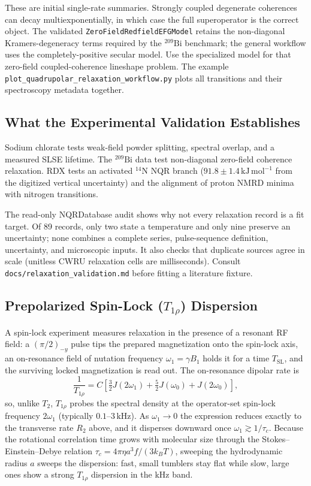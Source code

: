 \documentclass[11pt,oneside]{report}
\newcommand{\code}[1]{\texttt{#1}}
\begin{document}
These are initial single-rate summaries. Strongly coupled degenerate coherences
can decay multiexponentially, in which case the full superoperator is the
correct object. The validated \code{ZeroFieldRedfieldEFGModel} retains the
non-diagonal Kramers-degeneracy terms required by the
\(^{209}\mathrm{Bi}\) benchmark; the general workflow uses the
completely-positive secular model. Use the specialized model for that
zero-field coupled-coherence lineshape problem. The example
\code{plot\_quadrupolar\_relaxation\_workflow.py} plots all transitions and
their spectroscopy metadata together.

\subsection{What the Experimental Validation Establishes}

Sodium chlorate tests weak-field powder splitting, spectral overlap, and a
measured SLSE lifetime. The \(^{209}\mathrm{Bi}\) data test non-diagonal
zero-field coherence relaxation. RDX tests an activated \(^{14}\mathrm{N}\) NQR
branch (\(91.8\pm1.4\,\mathrm{kJ\,mol^{-1}}\) from the digitized vertical
uncertainty) and the alignment of proton NMRD minima with nitrogen transitions.

The read-only NQRDatabase audit shows why not every relaxation record is a fit
target. Of 89 records, only two state a temperature and only nine preserve an
uncertainty; none combines a complete series, pulse-sequence definition,
uncertainty, and microscopic inputs. It also checks that duplicate sources
agree in scale (unitless CWRU relaxation cells are milliseconds). Consult
\code{docs/relaxation\_validation.md} before fitting a literature fixture.

\subsection{Prepolarized Spin-Lock (\texorpdfstring{$T_{1\rho}$}{T1rho}) Dispersion}

A spin-lock experiment measures relaxation in the presence of a resonant RF
field: a \((\pi/2)_{-y}\) pulse tips the prepared magnetization onto the
spin-lock axis, an on-resonance field of nutation frequency
\(\omega_1=\gamma B_1\) holds it for a time \(T_{\mathrm{SL}}\), and the surviving
locked magnetization is read out. The on-resonance dipolar rate is
\[
  \frac{1}{T_{1\rho}}
    = C\left[\tfrac{3}{2}J(2\omega_1)
      + \tfrac{5}{2}J(\omega_0) + J(2\omega_0)\right],
\]
so, unlike \(T_2\), \(T_{1\rho}\) probes the spectral density at the operator-set
spin-lock frequency \(2\omega_1\) (typically \(0.1\text{--}3\,\mathrm{kHz}\)). As
\(\omega_1\to 0\) the expression reduces exactly to the transverse rate \(R_2\)
above, and it disperses downward once \(\omega_1\gtrsim 1/\tau_c\). Because the
rotational correlation time grows with molecular size through the
Stokes--Einstein--Debye relation
\(\tau_c = 4\pi\eta a^3 f/(3 k_B T)\), sweeping the hydrodynamic radius \(a\)
sweeps the dispersion: fast, small tumblers stay flat while slow, large ones
show a strong \(T_{1\rho}\) dispersion in the kHz band.
\end{document}
